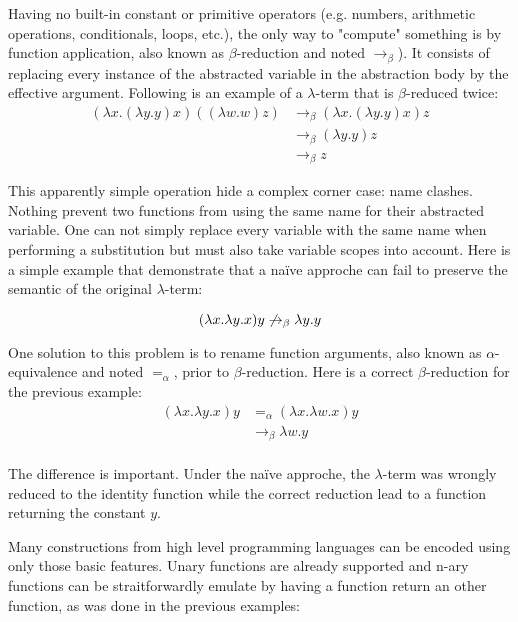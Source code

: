Having no built-in constant or primitive operators (e.g. numbers, arithmetic operations,
conditionals, loops, etc.), the only way to "compute" something is by function application, also
known as $\beta$-reduction and noted $\to_\beta$). It consists of replacing every instance of the
abstracted variable in the abstraction body by the effective argument. Following is an example of a
$\lambda$-term that is $\beta$-reduced twice:
\begin{align*}
  (\lambda x. (\lambda y. y) x) ((\lambda w. w) z)
    & \to_\beta (\lambda x. (\lambda y. y) x) z \\
    & \to_\beta (\lambda y. y) z \\
    & \to_\beta z
\end{align*}

This apparently simple operation hide a complex corner case: name clashes. Nothing prevent two
functions from using the same name for their abstracted variable. One can not simply replace every
variable with the same name when performing a substitution but must also take variable scopes into
account. Here is a simple example that demonstrate that a naïve approche can fail to preserve the
semantic of the original $\lambda$-term:

\begin{displaymath}
  (\lambda x. \lambda y. x) y \not\to_\beta \lambda y. y \\
\end{displaymath}

One solution to this problem is to rename function arguments, also known as $\alpha$-equivalence and
noted $=_\alpha$, prior to $\beta$-reduction. Here is a correct $\beta$-reduction for the previous
example:
\begin{align*}
  (\lambda x. \lambda y. x) y
    & =_\alpha (\lambda x. \lambda w. x) y \\
    & \to_\beta \lambda w. y \\
\end{align*}

The difference is important. Under the naïve approche, the $\lambda$-term was wrongly reduced to the
identity function while the correct reduction lead to a function returning the constant $y$.

Many constructions from high level programming languages can be encoded using only those basic
features.  Unary functions are already supported and n-ary functions can be straitforwardly emulate
by having a function return an other function, as was done in the previous examples:

